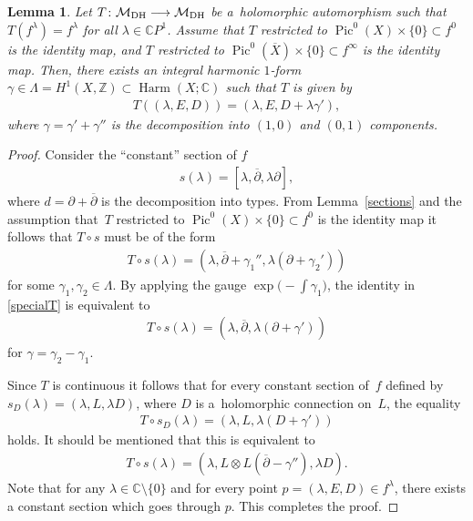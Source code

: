 \documentclass[pdftex]{sigma}
\numberwithin{equation}{section}
\newtheorem{Lemma}[Theorem]{Lemma}
\begin{document}
\begin{Lemma}\label{almost-id} Let $T \colon {\mathcal M}_{\rm DH} \longrightarrow {\mathcal M}_{\rm DH}$ be a~holomorphic automorphism such that
$T(f^\lambda) = f^\lambda$ for all $\lambda \in \mathbb CP^1$. Assume that $T$ restricted to $\operatorname{Pic}^0(X)\times\{0\} \subset f^0$ is the
identity map, and $T$ restricted to $\operatorname{Pic}^0(\overline{X})\times\{0\} \subset f^\infty$ is the identity map. Then, there exists an integral harmonic $1$-form $\gamma \in \Lambda = H^1(X, \mathbb Z) \subset \operatorname{Harm}(X; \mathbb C)$ such that $T$ is given by
\begin{gather*}T((\lambda, E, D)) = (\lambda, E, D+\lambda\gamma') ,\end{gather*}
where $\gamma = \gamma'+\gamma''$ is the decomposition into $(1,0)$ and $(0,1)$ components.
\end{Lemma}

\begin{proof}
Consider the ``constant'' section of $f$
\begin{gather*}s(\lambda) = [\lambda, \overline{\partial}, \lambda \partial],\end{gather*}
where $d = \partial+\overline{\partial}$ is the decomposition into types. From Lemma~\ref{sections} and the assumption that~$T$ restricted to $\operatorname{Pic}^0(X)\times\{0\} \subset f^0$ is the identity map it follows that $T\circ s$ must be of the form
\begin{gather}\label{specialT}
T\circ s(\lambda) = (\lambda, \overline{\partial}+\gamma_1'', \lambda (\partial+\gamma_2'))
\end{gather}
for some $\gamma_1, \gamma_2 \in \Lambda$. By applying the gauge $\exp\big({-}\int\gamma_1\big)$, the identity in \eqref{specialT} is equivalent to
\begin{gather*}T\circ s(\lambda) = (\lambda, \overline{\partial}, \lambda (\partial+\gamma'))\end{gather*}
 for $\gamma = \gamma_2-\gamma_1$.

Since $T$ is continuous it follows that for every constant section of~$f$ def\/ined by $s_D(\lambda) = (\lambda, L, \lambda D)$, where $D$ is a~holomorphic connection on~$L$, the equality
\begin{gather*}T\circ s_D(\lambda) = (\lambda, L, \lambda (D+\gamma'))\end{gather*}
holds. It should be mentioned that this is equivalent to
\begin{gather*}T\circ s(\lambda) = (\lambda, L\otimes L(\overline{\partial}-\gamma''), \lambda D) .\end{gather*}
Note that for any $\lambda \in {\mathbb C}\setminus\{0\}$ and for every point $p = (\lambda, E, D) \in f^\lambda$, there exists a constant section
which goes through $p$. This completes the proof.
\end{proof}
\end{document}
